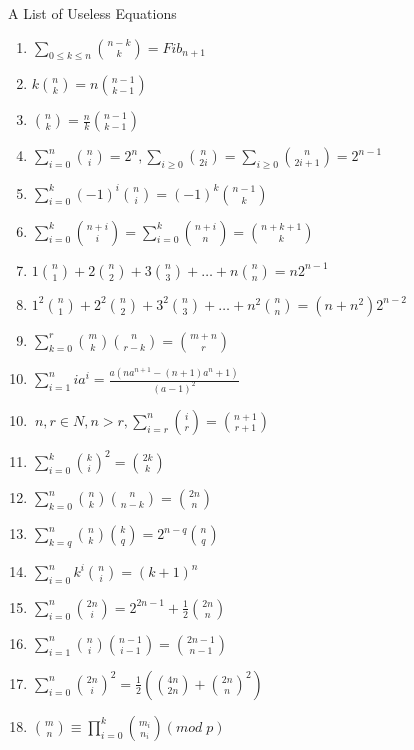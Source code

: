 \begin{Large}
	\begin{center}
		A List of Useless Equations
	\end{center}
	
	\begin{minipage}{0.5\textwidth}
		\begin{flushleft}
			\begin{enumerate}
				\item $\sum \limits_{0\leq k \leq n} {n-k \choose k} = Fib_{n+1}$
				\item $k{n \choose k}=n{n-1 \choose k-1}$
				\item ${n \choose k}=\frac{n}{k}{n-1 \choose k-1}$
				\item $\sum \limits_{i=0}^n{n \choose i}=2^n, \sum \limits_{i\geq 0}{n \choose 2i}=\sum \limits_{i\geq 0}{n \choose 2i+1}=2^{n-1}$
				\item $\sum \limits_{i= 0}^k \left( -1 \right) ^i{n \choose i}=\left( -1 \right) ^k{n-1 \choose k}$
				\item $\sum \limits_{i= 0}^k{n+i \choose i}= \sum \limits_{i= 0}^k{n+i \choose n} = {n+k+1 \choose k}$
				\item $1{n \choose 1}+2{n \choose 2}+3{n \choose 3}+…+n{n \choose n}=n2^{n-1}$
				\item $1^2{n \choose 1}+2^2{n \choose 2}+3^2{n \choose 3}+…+n^2{n \choose n}=(n+n^2)2^{n-2}$
				\item $\sum \limits_{k=0}^r{m \choose k}{n \choose r-k}={m+n \choose r}$
				\item $\sum_{i = 1}^n{ia^i} = \frac{a(n a^{n + 1} - (n + 1) a^n + 1)}{(a - 1)^2}$
			\end{enumerate}
		\end{flushleft}
	\end{minipage}
	\begin{minipage}{0.5\textwidth}
		\begin{flushleft}
			\begin{enumerate}
				\setcounter{enumi}{9}
				\item $\ n,r \in N, n > r, \sum \limits_{i=r}^n{i \choose r}={n+1 \choose r+1}$
				\item $\sum \limits_{i=0}^k{k \choose i}^2={2k \choose k}$
				\item $\sum \limits_{k=0}^n{n \choose k}{n \choose n-k}={2n \choose n}$
				\item $\sum \limits_{k=q}^n{n \choose k}{k \choose q}=2^{n-q}{n \choose q}$
				\item $\sum \limits_{i=0}^nk^i{n \choose i}=(k+1)^n$
				\item $\sum \limits_{i=0}^n{2n \choose i}=2^{2n-1}+\frac{1}{2}{2n \choose n}$
				\item $\sum \limits_{i=1}^n{n \choose i}{n-1 \choose i-1}={2n-1 \choose n-1}$
				\item $\sum \limits_{i=0}^n{2n \choose i}^2=\frac{1}{2} \left( {4n \choose 2n}+{2n \choose n}^2 \right)$
				\item ${{m} \choose {n}} \equiv \prod_{i=0}^{k} {{m_{i}} \choose {n_{i}}} (mod\; p)$
			\end{enumerate}
		\end{flushleft}
	\end{minipage}
	\end{Large}
